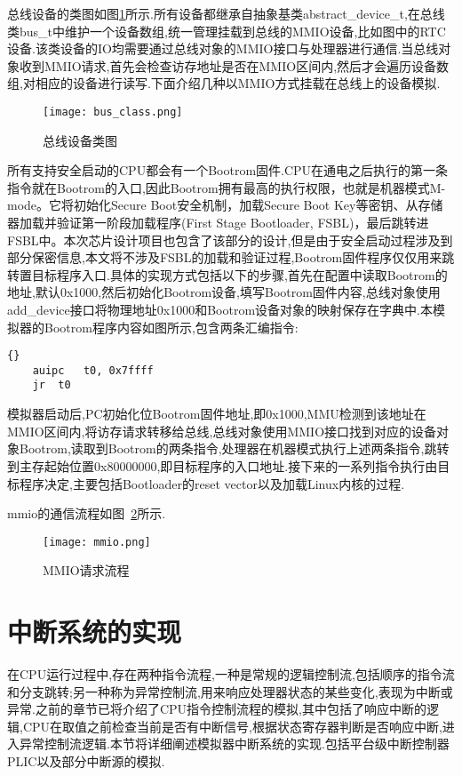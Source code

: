 总线设备的类图如图\ref{fig:bus_class}所示.所有设备都继承自抽象基类abstract\_device\_t,在总线类bus\_t中维护一个设备数组,统一管理挂载到总线的MMIO设备,比如图中的RTC设备.该类设备的IO均需要通过总线对象的MMIO接口与处理器进行通信.当总线对象收到MMIO请求,首先会检查访存地址是否在MMIO区间内,然后才会遍历设备数组,对相应的设备进行读写.下面介绍几种以MMIO方式挂载在总线上的设备模拟.
\begin{figure}[h]
    \centering
    \texttt{[image: bus\_class.png]}
    \caption{总线设备类图}
    \label{fig:bus_class}
\end{figure}


所有支持安全启动的CPU都会有一个Bootrom固件.CPU在通电之后执行的第一条指令就在Bootrom的入口,因此Bootrom拥有最高的执行权限，也就是机器模式M-mode。它将初始化Secure Boot安全机制，加载Secure Boot Key等密钥、从存储器加载并验证第一阶段加载程序(First Stage Bootloader, FSBL)，最后跳转进FSBL中。本次芯片设计项目也包含了该部分的设计,但是由于安全启动过程涉及到部分保密信息,本文将不涉及FSBL的加载和验证过程,Bootrom固件程序仅仅用来跳转置目标程序入口.具体的实现方式包括以下的步骤,首先在配置中读取Bootrom的地址,默认0x1000,然后初始化Bootrom设备,填写Bootrom固件内容,总线对象使用add\_device接口将物理地址0x1000和Bootrom设备对象的映射保存在字典中.本模拟器的Bootrom程序内容如图所示,包含两条汇编指令:
\begin{lstlisting}{}
    auipc	t0, 0x7ffff
    jr 	t0
\end{lstlisting}
模拟器启动后,PC初始化位Bootrom固件地址,即0x1000,MMU检测到该地址在MMIO区间内,将访存请求转移给总线,总线对象使用MMIO接口找到对应的设备对象Bootrom,读取到Bootrom的两条指令,处理器在机器模式执行上述两条指令,跳转到主存起始位置0x80000000,即目标程序的入口地址.接下来的一系列指令执行由目标程序决定,主要包括Bootloader的reset vector以及加载Linux内核的过程.

mmio的通信流程如图~\ref{fig:mmio}所示.
\begin{figure}[h]
    \centering
    \texttt{[image: mmio.png]}
    \caption{MMIO请求流程}
    \label{fig:mmio}
\end{figure}


\section{中断系统的实现}

在CPU运行过程中,存在两种指令流程,一种是常规的逻辑控制流,包括顺序的指令流和分支跳转;另一种称为异常控制流,用来响应处理器状态的某些变化,表现为中断或异常.之前的章节已将介绍了CPU指令控制流程的模拟,其中包括了响应中断的逻辑,CPU在取值之前检查当前是否有中断信号,根据状态寄存器判断是否响应中断,进入异常控制流逻辑.本节将详细阐述模拟器中断系统的实现.包括平台级中断控制器PLIC以及部分中断源的模拟.


